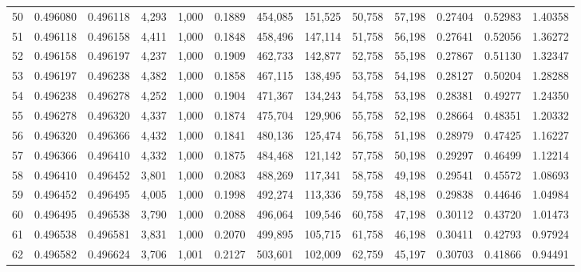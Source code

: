 \begin{tabular}{rrrrrrrrrrrrr}
50  &  0.496080 &  0.496118 &   4,293 &  1,000 &                                     0.1889 &  454,085 &  151,525 &   50,758 &   57,198 &  0.27404 &  0.52983 &  1.40358 \\
51  &  0.496118 &  0.496158 &   4,411 &  1,000 &                                     0.1848 &  458,496 &  147,114 &   51,758 &   56,198 &  0.27641 &  0.52056 &  1.36272 \\
52  &  0.496158 &  0.496197 &   4,237 &  1,000 &                                     0.1909 &  462,733 &  142,877 &   52,758 &   55,198 &  0.27867 &  0.51130 &  1.32347 \\
53  &  0.496197 &  0.496238 &   4,382 &  1,000 &                                     0.1858 &  467,115 &  138,495 &   53,758 &   54,198 &  0.28127 &  0.50204 &  1.28288 \\
54  &  0.496238 &  0.496278 &   4,252 &  1,000 &                                     0.1904 &  471,367 &  134,243 &   54,758 &   53,198 &  0.28381 &  0.49277 &  1.24350 \\
55  &  0.496278 &  0.496320 &   4,337 &  1,000 &                                     0.1874 &  475,704 &  129,906 &   55,758 &   52,198 &  0.28664 &  0.48351 &  1.20332 \\
56  &  0.496320 &  0.496366 &   4,432 &  1,000 &                                     0.1841 &  480,136 &  125,474 &   56,758 &   51,198 &  0.28979 &  0.47425 &  1.16227 \\
57  &  0.496366 &  0.496410 &   4,332 &  1,000 &                                     0.1875 &  484,468 &  121,142 &   57,758 &   50,198 &  0.29297 &  0.46499 &  1.12214 \\
58  &  0.496410 &  0.496452 &   3,801 &  1,000 &                                     0.2083 &  488,269 &  117,341 &   58,758 &   49,198 &  0.29541 &  0.45572 &  1.08693 \\
59  &  0.496452 &  0.496495 &   4,005 &  1,000 &                                     0.1998 &  492,274 &  113,336 &   59,758 &   48,198 &  0.29838 &  0.44646 &  1.04984 \\
60  &  0.496495 &  0.496538 &   3,790 &  1,000 &                                     0.2088 &  496,064 &  109,546 &   60,758 &   47,198 &  0.30112 &  0.43720 &  1.01473 \\
61  &  0.496538 &  0.496581 &   3,831 &  1,000 &                                     0.2070 &  499,895 &  105,715 &   61,758 &   46,198 &  0.30411 &  0.42793 &  0.97924 \\
62  &  0.496582 &  0.496624 &   3,706 &  1,001 &                                     0.2127 &  503,601 &  102,009 &   62,759 &   45,197 &  0.30703 &  0.41866 &  0.94491 \\

\end{tabular}
